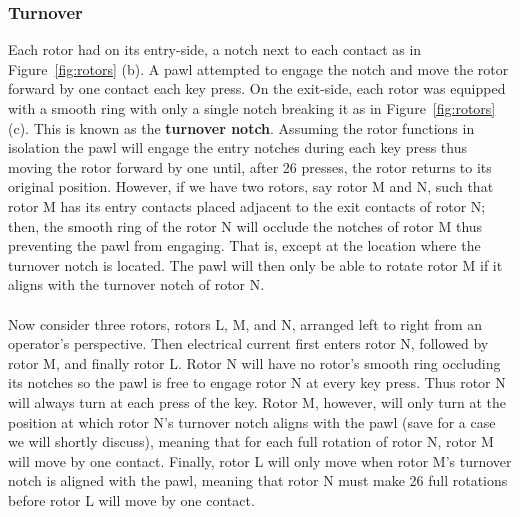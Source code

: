 \subsubsection{Turnover}
Each rotor had on its entry-side, a notch next to each contact as in
Figure~\ref{fig:rotors} (b). A pawl
attempted to engage
the notch and move the rotor forward by one contact each key press.
On the exit-side, each
rotor was equipped with a smooth ring with only a single notch
breaking it as in Figure~\ref{fig:rotors} (c). This is known as the
{\bf{turnover notch}}. Assuming the
rotor functions in isolation the pawl will engage the entry notches
during each key press thus moving the rotor forward by one until,
after 26 presses, the rotor returns to its original position.
However, if we have two rotors, say rotor M and N, such that rotor M
has its entry contacts placed adjacent to the exit contacts of rotor
N; then, the smooth ring of the rotor N will occlude the notches of
rotor M thus preventing the pawl from engaging. That is, except at
the location where the turnover notch is located. The pawl will then
only be able to rotate rotor M if it aligns with the turnover notch of rotor N.
\\\\Now consider three rotors, rotors L, M, and N, arranged left to
right from an operator's perspective. Then electrical current first
enters rotor N, followed by rotor M, and finally rotor L. Rotor N
will have no rotor's smooth ring occluding its notches so the pawl is
free to engage rotor N at every key press. Thus rotor N will always
turn at each press of the key. Rotor M, however, will only turn at
the position at which rotor N's turnover notch aligns with the pawl
(save for a case we will shortly discuss),
meaning that for each full rotation of rotor N, rotor M will move
by one contact. Finally, rotor L will only move when rotor M's
turnover notch is aligned with the pawl, meaning that rotor N must
make 26 full rotations before rotor L will move by one contact.

